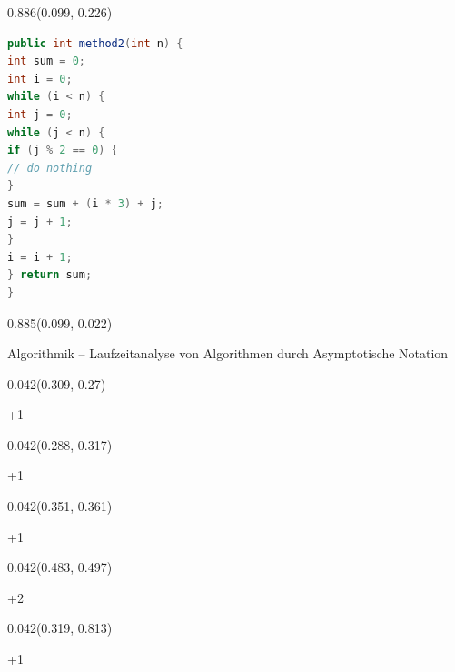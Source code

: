 \documentclass[aspectratio=169]{beamer}
\begin{document}
\begin{frame}[fragile]
\begin{textblock}{0.886}(0.099, 0.226)
  \begin{minipage}[t][0.63\paperheight]{\linewidth}
    \begin{lstlisting}[language=Java, basicstyle=\ttfamily\scriptsize]
public int method2(int n) {
int sum = 0;
int i = 0;
while (i < n) {
int j = 0;
while (j < n) {
if (j % 2 == 0) {
// do nothing
}
sum = sum + (i * 3) + j;
j = j + 1;
}
i = i + 1;
} return sum;
}
    \end{lstlisting}
  \end{minipage}
\end{textblock}

\begin{textblock}{0.885}(0.099, 0.022)
  \begin{minipage}[b][0.031\paperheight]{\linewidth}
    \raggedright
    \fontsize{3}{3.3}\selectfont Algorithmik – Laufzeitanalyse von Algorithmen durch Asymptotische Notation
  \end{minipage}
\end{textblock}

\begin{textblock}{0.042}(0.309, 0.27)
  \begin{minipage}[t][0.044\paperheight]{\linewidth}
    +1
  \end{minipage}
\end{textblock}

\begin{textblock}{0.042}(0.288, 0.317)
  \begin{minipage}[t][0.044\paperheight]{\linewidth}
    +1
  \end{minipage}
\end{textblock}

\begin{textblock}{0.042}(0.351, 0.361)
  \begin{minipage}[t][0.044\paperheight]{\linewidth}
    +1
  \end{minipage}
\end{textblock}

\begin{textblock}{0.042}(0.483, 0.497)
  \begin{minipage}[t][0.044\paperheight]{\linewidth}
    +2
  \end{minipage}
\end{textblock}

\begin{textblock}{0.042}(0.319, 0.813)
  \begin{minipage}[t][0.044\paperheight]{\linewidth}
    +1
  \end{minipage}
\end{textblock}


\end{frame}
\end{document}
